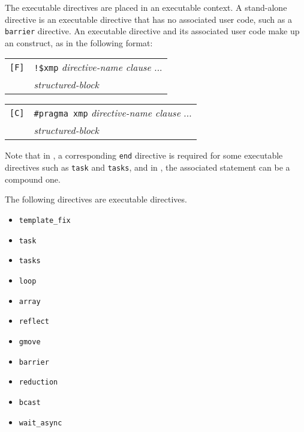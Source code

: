 The executable directives are placed in an executable context. A
stand-alone directive is an executable directive that has no associated
user code, such as a {\tt barrier} directive.
%
An executable directive and its associated user code make up an
{\XMP} construct, as in the following format:

\vspace{0.5cm}

\begin{tabular}{ll}
\verb![F]! & \verb|!$xmp| {\it directive-name clause} ...\\
 & \hspace{0.5cm} {\it structured-block} \\
\end{tabular}

\vspace{0.3cm}

\begin{tabular}{ll}
\verb![C]! & \verb|#pragma xmp| {\it directive-name clause} ...\\
 & \hspace{0.5cm} {\it structured-block} \\
\end{tabular}

\vspace{0.5cm}

Note that in {\XMPF}, a corresponding {\tt end} directive is required
for some executable directives such as {\tt task} and {\tt tasks}, and
in {\XMPC}, the associated statement can be a compound one.

%

The following directives are executable directives.

\begin{itemize}
 \item {\tt template\_fix}
 \item {\tt task}
 \item {\tt tasks}
 \item {\tt loop}
 \item {\tt array}
 \item {\tt reflect}
 \item {\tt gmove}
 \item {\tt barrier}
 \item {\tt reduction}
 \item {\tt bcast}
 \item {\tt wait\_async}
\end{itemize}


